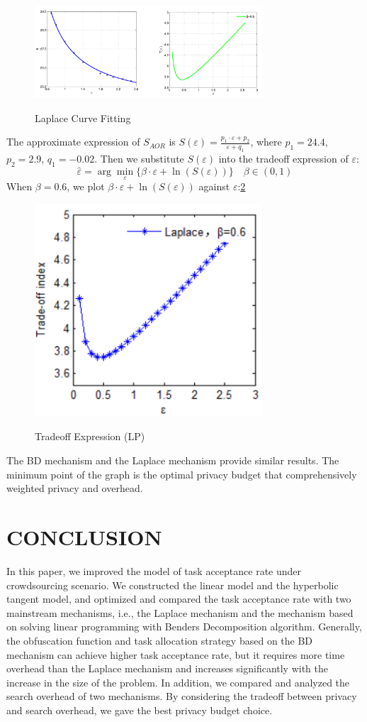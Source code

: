 \begin{figure}
\includegraphics[width=8.5cm]{CurveLP}
\label{img:CurveLP}
\caption{Laplace Curve Fitting}
\end{figure}

The approximate expression of $S_{AOR}$ is $S(\varepsilon)=\frac{p_1 \cdot \varepsilon + p_2}{\varepsilon+q_1}$, where $p_1=24.4$, $p_2=2.9$, $q_1=-0.02$. Then we substitute $S(\varepsilon)$ into the tradeoff expression of $\varepsilon$:
$$
	\hat{\varepsilon}=\arg \min_\varepsilon \{ \beta \cdot \varepsilon + \ln (S(\varepsilon)) \} \quad \beta \in (0,1)
$$
When $\beta=0.6$, we plot $\beta \cdot \varepsilon + \ln (S(\varepsilon))$ against $\varepsilon$:\ref{img:TradeoffLP}

\begin{figure}
\includegraphics[width=8.5cm]{TradeoffLP}
\label{img:TradeoffLP}
\caption{Tradeoff Expression (LP)}
\end{figure}

The BD mechanism and the Laplace mechanism provide similar results. The minimum point of the graph is the optimal privacy budget that comprehensively weighted privacy and overhead.

\section{CONCLUSION}
In this paper, we improved the model of task acceptance rate under crowdsourcing scenario. We constructed the linear model and the hyperbolic tangent model, and optimized and compared the task acceptance rate with two mainstream mechanisms, i.e., the Laplace mechanism and the mechanism based on solving linear programming with Benders Decomposition algorithm. Generally, the obfuscation function and task allocation strategy based on the BD mechanism can achieve higher task acceptance rate, but it requires more time overhead than the Laplace mechanism and increases significantly with the increase in the size of the problem. In addition, we compared and analyzed the search overhead of two mechanisms. By considering the tradeoff between privacy and search overhead, we gave the best privacy budget choice.
